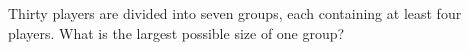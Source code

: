 Thirty players are divided into seven groups, each containing at least four players. What is the largest possible size of one group?
